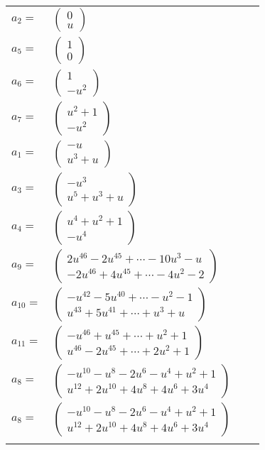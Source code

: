 \documentclass[1p]{elsarticle_modified}
\theoremstyle{definition}
\begin{document}
\begin{tabular}{m{7pt} m{180pt} m{7pt} m{180pt} }
\flushright $a_{2}=$&$\begin{pmatrix}0\\u\end{pmatrix}$ \\
\flushright $a_{5}=$&$\begin{pmatrix}1\\0\end{pmatrix}$ \\
\flushright $a_{6}=$&$\begin{pmatrix}1\\- u^2\end{pmatrix}$ \\
\flushright $a_{7}=$&$\begin{pmatrix}u^2+1\\- u^2\end{pmatrix}$ \\
\flushright $a_{1}=$&$\begin{pmatrix}- u\\u^3+u\end{pmatrix}$ \\
\flushright $a_{3}=$&$\begin{pmatrix}- u^3\\u^5+u^3+u\end{pmatrix}$ \\
\flushright $a_{4}=$&$\begin{pmatrix}u^4+u^2+1\\- u^4\end{pmatrix}$ \\
\flushright $a_{9}=$&$\begin{pmatrix}2 u^{46}-2 u^{45}+\cdots-10 u^3- u\\-2 u^{46}+4 u^{45}+\cdots-4 u^2-2\end{pmatrix}$ \\
\flushright $a_{10}=$&$\begin{pmatrix}- u^{42}-5 u^{40}+\cdots- u^2-1\\u^{43}+5 u^{41}+\cdots+u^3+u\end{pmatrix}$ \\
\flushright $a_{11}=$&$\begin{pmatrix}- u^{46}+u^{45}+\cdots+u^2+1\\u^{46}-2 u^{45}+\cdots+2 u^2+1\end{pmatrix}$ \\
\flushright $a_{8}=$&$\begin{pmatrix}- u^{10}- u^8-2 u^6- u^4+u^2+1\\u^{12}+2 u^{10}+4 u^8+4 u^6+3 u^4\end{pmatrix}$\\ \flushright $a_{8}=$&$\begin{pmatrix}- u^{10}- u^8-2 u^6- u^4+u^2+1\\u^{12}+2 u^{10}+4 u^8+4 u^6+3 u^4\end{pmatrix}$\\&\end{tabular}
\end{document}
